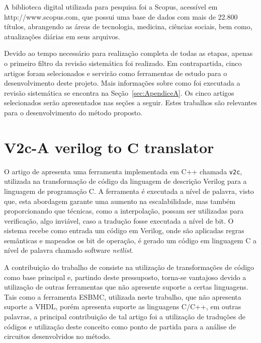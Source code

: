 \par
A biblioteca digital utilizada para pesquisa foi a Scopus, acessível em http://www.scopus.com, que possui uma base de dados com mais de 22.800 títulos, abrangendo as áreas de tecnologia, medicina, ciências sociais, bem como, atualizações diárias em seus arquivos.

\par
Devido ao tempo necessário para realização completa de todas as etapas, apenas o primeiro filtro da revisão sistemática foi realizado. Em contrapartida, cinco artigos foram selecionados e servirão como ferramentas de estudo para o desenvolvimento deste projeto. Mais informações sobre como foi executada a revisão sistemática se encontra na Seção~\ref{sec:ApendiceA}. Os cinco artigos selecionados serão apresentados nas seções a seguir. Estes trabalhos são relevantes para o desenvolvimento do método proposto. 

\section{V2c-A verilog to C translator}

O artigo de  apresenta uma ferramenta implementada em C++ chamada \texttt{v2c}, utilizada na transformação de código da linguagem de descrição Verilog para a linguagem de programação C. A ferramenta é executada a nível de palavra, visto que, esta abordagem garante uma aumento na escalabilidade, mas também proporcionando que técnicas, como a interpolação\cite{beyer2011cpachecker}, possam ser utilizadas para verificação, algo inviável, caso a tradução fosse executada a nível de bit. O sistema recebe como entrada um código em Verilog, onde são aplicadas regras semânticas e mapeados os bit de operação, é gerado um código em linguagem C a nível de palavra chamado software \textit{netlist}.

\par
A contribuição do trabalho de  consiste na utilização de transformações de código como base principal e, partindo deste pressuposto, torna-se vantajoso devido a utilização de outras ferramentas que não apresente suporte a certas linguagens. Tais como a ferramenta ESBMC, utilizada neste trabalho, que não apresenta suporte a VHDL, porém apresenta suporte as linguagens C/C++, em outras palavras, a principal contribuição de tal artigo foi a utilização de traduções de códigos e utilização deste conceito como ponto de partida para a análise de circuitos desenvolvidos no método.

